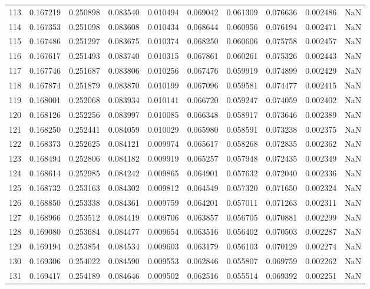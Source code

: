 \begin{tabular}{lrrrrrrrrr}
113 & 0.167219 & 0.250898 & 0.083540 & 0.010494 & 0.069042 & 0.061309 & 0.076636 & 0.002486 & NaN \\
114 & 0.167353 & 0.251098 & 0.083608 & 0.010434 & 0.068644 & 0.060956 & 0.076194 & 0.002471 & NaN \\
115 & 0.167486 & 0.251297 & 0.083675 & 0.010374 & 0.068250 & 0.060606 & 0.075758 & 0.002457 & NaN \\
116 & 0.167617 & 0.251493 & 0.083740 & 0.010315 & 0.067861 & 0.060261 & 0.075326 & 0.002443 & NaN \\
117 & 0.167746 & 0.251687 & 0.083806 & 0.010256 & 0.067476 & 0.059919 & 0.074899 & 0.002429 & NaN \\
118 & 0.167874 & 0.251879 & 0.083870 & 0.010199 & 0.067096 & 0.059581 & 0.074477 & 0.002415 & NaN \\
119 & 0.168001 & 0.252068 & 0.083934 & 0.010141 & 0.066720 & 0.059247 & 0.074059 & 0.002402 & NaN \\
120 & 0.168126 & 0.252256 & 0.083997 & 0.010085 & 0.066348 & 0.058917 & 0.073646 & 0.002389 & NaN \\
121 & 0.168250 & 0.252441 & 0.084059 & 0.010029 & 0.065980 & 0.058591 & 0.073238 & 0.002375 & NaN \\
122 & 0.168373 & 0.252625 & 0.084121 & 0.009974 & 0.065617 & 0.058268 & 0.072835 & 0.002362 & NaN \\
123 & 0.168494 & 0.252806 & 0.084182 & 0.009919 & 0.065257 & 0.057948 & 0.072435 & 0.002349 & NaN \\
124 & 0.168614 & 0.252985 & 0.084242 & 0.009865 & 0.064901 & 0.057632 & 0.072040 & 0.002336 & NaN \\
125 & 0.168732 & 0.253163 & 0.084302 & 0.009812 & 0.064549 & 0.057320 & 0.071650 & 0.002324 & NaN \\
126 & 0.168850 & 0.253338 & 0.084361 & 0.009759 & 0.064201 & 0.057011 & 0.071263 & 0.002311 & NaN \\
127 & 0.168966 & 0.253512 & 0.084419 & 0.009706 & 0.063857 & 0.056705 & 0.070881 & 0.002299 & NaN \\
128 & 0.169080 & 0.253684 & 0.084477 & 0.009654 & 0.063516 & 0.056402 & 0.070503 & 0.002287 & NaN \\
129 & 0.169194 & 0.253854 & 0.084534 & 0.009603 & 0.063179 & 0.056103 & 0.070129 & 0.002274 & NaN \\
130 & 0.169306 & 0.254022 & 0.084590 & 0.009553 & 0.062846 & 0.055807 & 0.069759 & 0.002262 & NaN \\
131 & 0.169417 & 0.254189 & 0.084646 & 0.009502 & 0.062516 & 0.055514 & 0.069392 & 0.002251 & NaN \\

\end{tabular}
